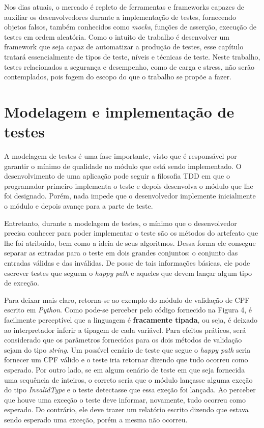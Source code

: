 \documentclass[
    12pt,       %
    openright,      %
    twoside,      %
    a4paper,      %
    english,      %
    french,       %
    spanish,      %
    brazil,       %
    ]{abntex2}
\begin{document}
      Nos dias atuais, o mercado é repleto de ferramentas e frameworks capazes de
      auxiliar os desenvolvedores durante a implementação de testes, fornecendo
      objetos falsos, também conhecidos como \textit{mocks}, funções de asserção,
      execução de testes em ordem aleatória. Como o intuito de trabalho é desenvolver
      um framework que seja capaz de automatizar a produção de testes, esse capítulo
      tratará essencialmente de tipos de teste, níveis e técnicas de teste. Neste trabalho,
      testes relacionados a segurança e desempenho, como de carga e stress, não serão
      contemplados, pois fogem do escopo do que o trabalho se propõe a fazer.

      \section{Modelagem e implementação de testes}
          A modelagem de testes é uma fase importante, visto que é responsável
          por garantir o mínimo de qualidade no módulo que está sendo implementado.
          O desenvolvimento de uma aplicação pode seguir a filosofia TDD em que o
          programador primeiro implementa o teste e depois desenvolva o módulo que
          lhe foi designado. Porém, nada impede que o desenvolvedor implemente
          inicialmente o módulo e depois avançe para a parte de teste.

          Entretanto, durante a modelagem de testes, o mínimo que o desenvolvedor precisa
          conhecer para poder implementar o teste são os métodos do artefeato que
          lhe foi atribuido, bem como a ideia de seus algoritmos. Dessa forma ele
          consegue separar as entradas para o teste em dois grandes conjuntos: o
          conjunto das entradas válidas e das inválidas. De posse de tais informações
          básicas, ele pode escrever testes que seguem o \textit{happy path} e aqueles
          que devem lançar algum tipo de exceção.

          Para deixar mais claro, retorna-se ao exemplo do módulo de validação de CPF
          escrito em \textit{Python}. Como pode-se perceber pelo código fornecido na
          Figura 4, é facilmente perceptível que a linguagem é \textbf{fracamente tipada},
          ou seja, é deixado ao interpretador inferir a tipagem de cada variável. Para
          efeitos práticos, será considerado que os parâmetros fornecidos para os dois
          métodos de validação sejam do tipo \textit{string}. Um possível cenário de teste
          que segue o \textit{happy path} seria fornecer um CPF válido e o teste iria
          retornar dizendo que tudo ocorreu como esperado. Por outro lado, se em algum
          cenário de teste em que seja fornecida uma sequência de inteiros, o correto
          seria que o módulo lançasse alguma exeção do tipo \textit{InvalidType} e o
          teste detectasse que essa exeção foi lançada. Ao perceber que houve uma exceção
          o teste deve informar, novamente, tudo ocorreu como esperado. Do contrário, ele
          deve trazer um relatório escrito dizendo que estava sendo esperado uma exceção,
          porém a mesma não ocorreu.
\end{document}
